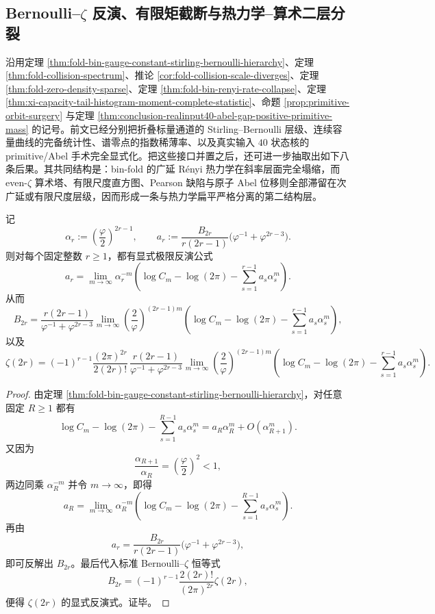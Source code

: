 \subsection{Bernoulli--\texorpdfstring{$\zeta$}{zeta} 反演、有限矩截断与热力学--算术二层分裂}\label{subsec:conclusion-bernoulli-zeta-moment-truncation-pearson-abel-arithmetic-splitting}
沿用定理 \ref{thm:fold-bin-gauge-constant-stirling-bernoulli-hierarchy}、定理 \ref{thm:fold-collision-spectrum}、推论 \ref{cor:fold-collision-scale-diverges}、定理 \ref{thm:fold-zero-density-sparse}、定理 \ref{thm:fold-bin-renyi-rate-collapse}、定理 \ref{thm:xi-capacity-tail-histogram-moment-complete-statistic}、命题 \ref{prop:primitive-orbit-surgery} 与定理 \ref{thm:conclusion-realinput40-abel-gap-positive-primitive-mass} 的记号。前文已经分别把折叠标量通道的 Stirling--Bernoulli 层级、连续容量曲线的完备统计性、谱零点的指数稀薄率、以及真实输入 \(40\) 状态核的 primitive/Abel 手术完全显式化。把这些接口并置之后，还可进一步抽取出如下八条后果。其共同结构是：bin-fold 的广延 Rényi 热力学在斜率层面完全塌缩，而 even-\(\zeta\) 算术塔、有限尺度直方图、Pearson 缺陷与原子 Abel 位移则全部滞留在次广延或有限尺度层级，因而形成一条与热力学扁平严格分离的第二结构层。

\begin{theorem}\label{thm:conclusion-bernoulli-zeta-tower-explicit-triangular-inversion}
记
\[
\alpha_r:=\left(\frac{\varphi}{2}\right)^{2r-1},
\qquad
a_r:=
\frac{B_{2r}}{r(2r-1)}
\bigl(\varphi^{-1}+\varphi^{2r-3}\bigr).
\]
则对每个固定整数 \(r\ge 1\)，都有显式极限反演公式
\[
a_r=
\lim_{m\to\infty}\alpha_r^{-m}
\left(
\log C_m-\log(2\pi)-\sum_{s=1}^{r-1}a_s\alpha_s^m
\right).
\]
从而
\[
B_{2r}
=
\frac{r(2r-1)}{\varphi^{-1}+\varphi^{2r-3}}
\lim_{m\to\infty}
\left(\frac{2}{\varphi}\right)^{(2r-1)m}
\left(
\log C_m-\log(2\pi)-\sum_{s=1}^{r-1}a_s\alpha_s^m
\right),
\]
以及
\[
\zeta(2r)
=
(-1)^{r-1}\frac{(2\pi)^{2r}}{2(2r)!}\,
\frac{r(2r-1)}{\varphi^{-1}+\varphi^{2r-3}}
\lim_{m\to\infty}
\left(\frac{2}{\varphi}\right)^{(2r-1)m}
\left(
\log C_m-\log(2\pi)-\sum_{s=1}^{r-1}a_s\alpha_s^m
\right).
\]
\end{theorem}
\begin{proof}
由定理 \ref{thm:fold-bin-gauge-constant-stirling-bernoulli-hierarchy}，对任意固定 \(R\ge 1\) 都有
\[
\log C_m-\log(2\pi)-\sum_{s=1}^{R-1}a_s\alpha_s^m
=
a_R\alpha_R^m+O(\alpha_{R+1}^m).
\]
又因为
\[
\frac{\alpha_{R+1}}{\alpha_R}
=
\left(\frac{\varphi}{2}\right)^2<1,
\]
两边同乘 \(\alpha_R^{-m}\) 并令 \(m\to\infty\)，即得
\[
a_R=
\lim_{m\to\infty}\alpha_R^{-m}
\left(
\log C_m-\log(2\pi)-\sum_{s=1}^{R-1}a_s\alpha_s^m
\right).
\]
再由
\[
a_r=
\frac{B_{2r}}{r(2r-1)}
\bigl(\varphi^{-1}+\varphi^{2r-3}\bigr),
\]
即可反解出 \(B_{2r}\)。最后代入标准 Bernoulli--\(\zeta\) 恒等式
\[
B_{2r}=(-1)^{r-1}\frac{2(2r)!}{(2\pi)^{2r}}\zeta(2r),
\]
便得 \(\zeta(2r)\) 的显式反演式。证毕。
\end{proof}

